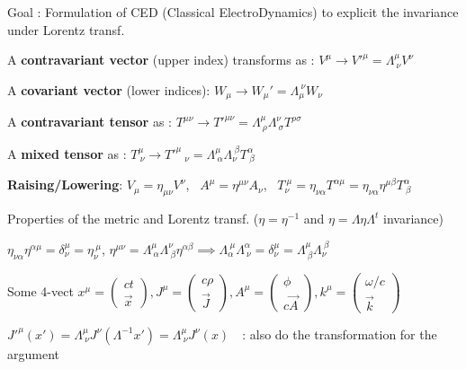 \squishend
\vspace{2cm}
\squishlist
\item[] Goal : Formulation of CED (Classical ElectroDynamics) to explicit the invariance under Lorentz transf. 

\item A \textbf{contravariant vector} (upper index) transforms as : $V^\mu\rightarrow V'^{\mu} = \Lambda^{\mu}_{\ \nu} V^{\nu}$

\item A \textbf{covariant vector} (lower indices): $W_{\mu} \rightarrow W_{\mu}' = \Lambda_{\mu}^{\ \nu}W_\nu $

\item A \textbf{contravariant tensor} as : $T^{\mu \nu} \rightarrow T'^{\mu \nu} = \Lambda^{\mu}_{\ \rho} \Lambda^{\nu}_{\ \sigma} T^{\rho \sigma}$

\item A \textbf{mixed tensor} as : $T^\mu_{\ \nu} \rightarrow T'^\mu_{\quad \nu} = \Lambda^\mu_{\ \alpha}\Lambda_\nu^{\ \beta}T_{\ \beta}^\alpha $ 

\item \textbf{Raising/Lowering}: $V_\mu=\eta_{\mu\nu}V^\nu$, \ $A^{\mu} = \eta^{\mu\nu} A_{\nu}$, \ $T^{\ \mu}_\nu = \eta_{\nu\alpha}T^{\alpha\mu}=\eta_{\nu\alpha}\eta^{\mu\beta} T^\alpha_{\ \beta}$

\item Properties of the metric and Lorentz transf. ($\eta=\eta^{-1}$ and $\eta=\Lambda\eta\Lambda^t$ invariance)

$ \eta_{\nu\alpha}\eta^{\alpha\mu} = \delta_\nu^\mu = \eta_\nu^{\ \mu}$, \quad $\eta^{\mu\nu} = \Lambda^{\mu}_{\ \alpha}\Lambda^{\nu}_{\ \beta}\eta^{\alpha\beta} \implies \Lambda_\alpha^{\ \mu}\Lambda^\alpha_{\ \nu} = \delta^\mu_\nu = \Lambda^\mu_{\ \beta}\Lambda_{\nu}^{\ \beta} $


\item Some 4-vect $ x^{\mu} =
	\begin{pmatrix}
	ct\\
	\vec{x}
	\end{pmatrix}, J^{\mu} = \begin{pmatrix}
	c\rho\\
	\vec{J}
	\end{pmatrix}, A^{\mu} =
	\begin{pmatrix}
	\phi\\
	c\vec{A}
	\end{pmatrix}, k^\mu=
    \begin{pmatrix}
     \omega/c \\
     \Vec{k}
    \end{pmatrix}$
\item $J'^{\mu} (x') = \Lambda^{\mu}_{\ \nu} J^{\nu}(\Lambda^{-1}x') = \Lambda^{\mu}_{\ \nu} J^{\nu} (x) $ \,\, : also do the transformation for the argument


